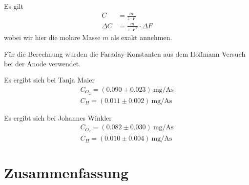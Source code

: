 \documentclass{article}
\begin{document}
Es gilt
\begin{align*}
C &= \frac{m}{z\cdot F} \\
\Delta C &= \frac{m}{z\cdot F^2}\cdot \Delta F
\end{align*}
wobei wir hier die molare Masse $m$ als exakt annehmen. 

Für die Berechnung wurden die Faraday-Konstanten aus dem Hoffmann Versuch bei der Anode verwendet.

Es ergibt sich bei Tanja Maier
\begin{align*}
C_{O_2} = (0.090 \pm 0.023)~\text{mg}/\text{As} \\
C_{H} = (0.011 \pm 0.002)~\text{mg}/\text{As} 
\end{align*}

Es ergibt sich bei Johannes Winkler
\begin{align*}
C_{O_2} = (0.082 \pm 0.030)~\text{mg}/\text{As} \\
C_{H} = (0.010 \pm 0.004)~\text{mg}/\text{As} 
\end{align*}



\section{Zusammenfassung}
\end{document}
